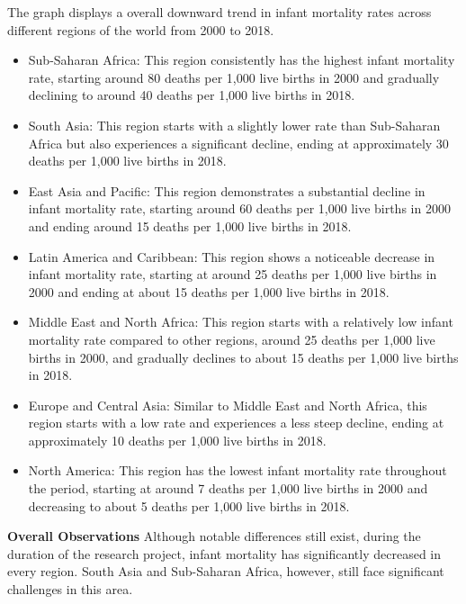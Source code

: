 \documentclass{article}\usepackage[]{graphicx}\usepackage[]{xcolor}
\begin{document}
The graph displays a overall downward trend in infant mortality rates across different regions of the world from 2000 to 2018.
\begin{itemize}
\item{Sub-Saharan Africa: This region consistently has the highest infant mortality rate, starting around 80 deaths per 1,000 live births in 2000 and gradually declining to around 40 deaths per 1,000 live births in 2018.}

\item{South Asia: This region starts with a slightly lower rate than Sub-Saharan Africa but also experiences a significant decline, ending at approximately 30 deaths per 1,000 live births in 2018.}

\item{East Asia and Pacific: This region demonstrates a substantial decline in infant mortality rate, starting around 60 deaths per 1,000 live births in 2000 and ending around 15 deaths per 1,000 live births in 2018.}

\item{Latin America and Caribbean: This region shows a noticeable decrease in infant mortality rate, starting at around 25 deaths per 1,000 live births in 2000 and ending at about 15 deaths per 1,000 live births in 2018.}

\item{Middle East and North Africa: This region starts with a relatively low infant mortality rate compared to other regions, around 25 deaths per 1,000 live births in 2000, and gradually declines to about 15 deaths per 1,000 live births in 2018.}

\item{Europe and Central Asia: Similar to Middle East and North Africa, this region starts with a low rate and experiences a less steep decline, ending at approximately 10 deaths per 1,000 live births in 2018.}

\item{North America: This region has the lowest infant mortality rate throughout the period, starting at around 7 deaths per 1,000 live births in 2000 and decreasing to about 5 deaths per 1,000 live births in 2018.}
\end{itemize}

\textbf{Overall Observations}
Although notable differences still exist, during the duration of the research project, infant mortality has significantly decreased in every region. South Asia and Sub-Saharan Africa, however, still face significant challenges in this area.
\end{document}
